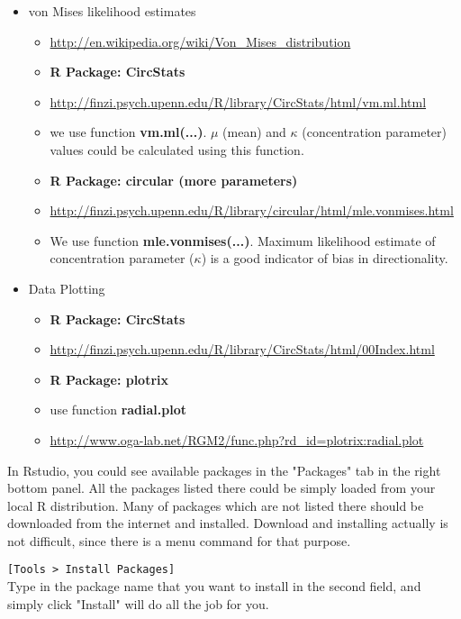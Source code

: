 \documentclass[11pnt]{article}
\begin{document}
\begin{description}
\begin{itemize}
\item von Mises likelihood estimates
\begin{itemize}
\item \url{http://en.wikipedia.org/wiki/Von\_Mises\_distribution}
\item \textbf{R Package: CircStats}
\item \url{http://finzi.psych.upenn.edu/R/library/CircStats/html/vm.ml.html}
\item we use function \textbf{vm.ml(...)}. $\mu$ (mean) and $\kappa$ (concentration parameter) values could be calculated using this function. 
  
\item \textbf{R Package: circular (more parameters)}
\item \url{http://finzi.psych.upenn.edu/R/library/circular/html/mle.vonmises.html}
\item We use function \textbf{mle.vonmises(...)}. Maximum likelihood estimate of concentration parameter ($\kappa$) is a good indicator of bias in directionality. 
\end{itemize}
\end{itemize}

\begin{itemize}
\item Data Plotting
\begin{itemize}
\item \textbf{R Package: CircStats}
\item \url{http://finzi.psych.upenn.edu/R/library/CircStats/html/00Index.html}
\item \textbf{R Package: plotrix}
\item use function \textbf{radial.plot}
\item \url{http://www.oga-lab.net/RGM2/func.php?rd_id=plotrix:radial.plot}
\end{itemize}
\end{itemize}

In Rstudio, you could see available packages in the "Packages" tab in the right bottom panel. All the packages listed there could be simply loaded from your local R distribution. Many of packages which are not listed there should be downloaded from the internet and installed. Download and installing actually is not difficult, since there is a menu command for that purpose. 

\verb"[Tools > Install Packages]"\hfill\\
Type in the package name that you want to install in the second field, and simply click "Install" will do all the job for you.


\end{description}
\end{document}
